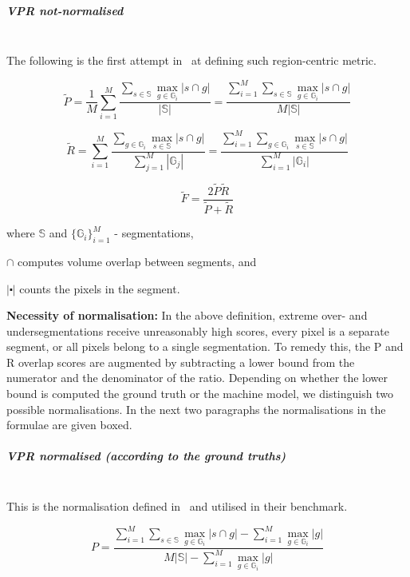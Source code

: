 \subparagraph{VPR not-normalised}\mbox{}\\
The following is the first attempt in~\cite{Galasso13} at defining such region-centric metric.

\[
\tilde{P}=\frac{1}{M}\sum\limits _{i=1}^{M}\frac{\sum\limits _{s\in\mathbb{S}}\max\limits _{g\in\mathbb{G}_{i}}\left|s\cap g\right|}{\left|\mathbb{S}\right|}=\frac{\sum\limits _{i=1}^{M}\sum\limits _{s\in\mathbb{S}}\max\limits _{g\in\mathbb{G}_{i}}\left|s\cap g\right|}{M\left|\mathbb{S}\right|}
\]

\[
\tilde{R}=\sum\limits _{i=1}^{M}\frac{\sum\limits _{g\in\mathbb{G}_{i}}\max\limits _{s\in\mathbb{S}}\left|s\cap g\right|}{\sum\limits _{j=1}^{M}\left|\mathbb{G}_{j}\right|}=\frac{\sum\limits _{i=1}^{M}\sum\limits _{g\in\mathbb{G}_{i}}\max\limits _{s\in\mathbb{S}}\left|s\cap g\right|}{\sum\limits _{i=1}^{M}\left|\mathbb{G}_{i}\right|}
\]


\[
\tilde{F}=\frac{2\tilde{P}\tilde{R}}{\tilde{P}+\tilde{R}}
\]

where $\mathbb{S}$ and $\{\mathbb{G}_{i}\}_{i=1}^{M}$ - segmentations,

$\cap$ computes volume overlap between segments, and 

$\left|\centerdot\right|$ counts the pixels in the segment.%

\textbf{Necessity of normalisation:} In the above definition, extreme over- and undersegmentations receive unreasonably high scores, \ie every pixel is a separate segment, or all pixels belong to a single segmentation. To remedy this, the P and R overlap scores are augmented by subtracting a lower bound from the numerator and the denominator of the ratio. Depending on whether the lower bound is computed \wrt the ground truth or the machine model, we distinguish two possible normalisations. In the next two paragraphs the normalisations in the formulae are given boxed.

\subparagraph{VPR normalised (according to the ground truths)}\mbox{}\\ %
This is the normalisation defined in~\cite{Galasso13} and utilised %
in their benchmark.

\[
P=\frac{\sum\limits _{i=1}^{M}\sum\limits _{s\in\mathbb{S}}\max\limits _{g\in\mathbb{G}_{i}}\left|s\cap g\right|-\boxed{\sum\limits _{i=1}^{M}\max\limits _{g\in\mathbb{G}_{i}}\left|g\right|}}{M\left|\mathbb{S}\right|-\boxed{\sum\limits _{i=1}^{M}\max\limits _{g\in\mathbb{G}_{i}}\left|g\right|}}
\]

